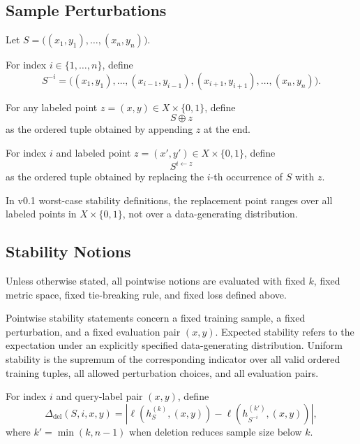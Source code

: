 \subsection{Sample Perturbations}

Let $S = \big((x_1, y_1), \ldots, (x_n, y_n)\big)$.

\begin{definition}
For index $i \in \{1, \ldots, n\}$, define
\[
S^{-i} = \big((x_1, y_1), \ldots, (x_{i-1}, y_{i-1}), (x_{i+1}, y_{i+1}), \ldots, (x_n, y_n)\big).
\]
\end{definition}

\begin{definition}
For any labeled point $z = (x, y) \in X \times \{0,1\}$, define
\[
S \oplus z
\]
as the ordered tuple obtained by appending $z$ at the end.
\end{definition}

\begin{definition}
For index $i$ and labeled point $z = (x', y') \in X \times \{0,1\}$, define
\[
S^{i \leftarrow z}
\]
as the ordered tuple obtained by replacing the $i$-th occurrence of $S$ with $z$.
\end{definition}

In v0.1 worst-case stability definitions, the replacement point ranges over all labeled points in $X \times \{0,1\}$, not over a data-generating distribution.

\subsection{Stability Notions}

Unless otherwise stated, all pointwise notions are evaluated with fixed $k$, fixed metric space, fixed tie-breaking rule, and fixed loss defined above.

\begin{note}
Pointwise stability statements concern a fixed training sample, a fixed perturbation, and a fixed evaluation pair $(x, y)$. Expected stability refers to the expectation under an explicitly specified data-generating distribution. Uniform stability is the supremum of the corresponding indicator over all valid ordered training tuples, all allowed perturbation choices, and all evaluation pairs.
\end{note}

\begin{definition}
For index $i$ and query-label pair $(x, y)$, define
\[
\Delta_{\mathrm{del}}(S, i, x, y)
=
\left| \ell(h_S^{(k)}, (x, y)) - \ell(h_{S^{-i}}^{(k')}, (x, y)) \right|,
\]
where $k' = \min(k, n-1)$ when deletion reduces sample size below $k$.
\end{definition}

